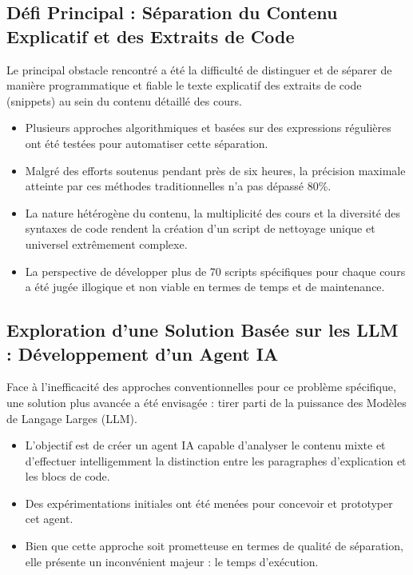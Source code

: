 \documentclass[12pt, a4paper]{article}
\begin{document}
\subsection{Défi Principal : Séparation du Contenu Explicatif et des Extraits de Code}
Le principal obstacle rencontré a été la difficulté de distinguer et de séparer de manière programmatique et fiable le texte explicatif des extraits de code (snippets) au sein du contenu détaillé des cours.
\begin{itemize}
    \item Plusieurs approches algorithmiques et basées sur des expressions régulières ont été testées pour automatiser cette séparation.
    \item Malgré des efforts soutenus pendant près de six heures, la précision maximale atteinte par ces méthodes traditionnelles n'a pas dépassé 80\%.
    \item La nature hétérogène du contenu, la multiplicité des cours et la diversité des syntaxes de code rendent la création d'un script de nettoyage unique et universel extrêmement complexe.
    \item La perspective de développer plus de 70 scripts spécifiques pour chaque cours a été jugée illogique et non viable en termes de temps et de maintenance.
\end{itemize}

\subsection{Exploration d'une Solution Basée sur les LLM : Développement d'un Agent IA}
Face à l'inefficacité des approches conventionnelles pour ce problème spécifique, une solution plus avancée a été envisagée : tirer parti de la puissance des Modèles de Langage Larges (LLM).
\begin{itemize}
    \item L'objectif est de créer un agent IA capable d'analyser le contenu mixte et d'effectuer intelligemment la distinction entre les paragraphes d'explication et les blocs de code.
    \item Des expérimentations initiales ont été menées pour concevoir et prototyper cet agent.
    \item Bien que cette approche soit prometteuse en termes de qualité de séparation, elle présente un inconvénient majeur : le temps d'exécution.
\end{itemize}
\end{document}
